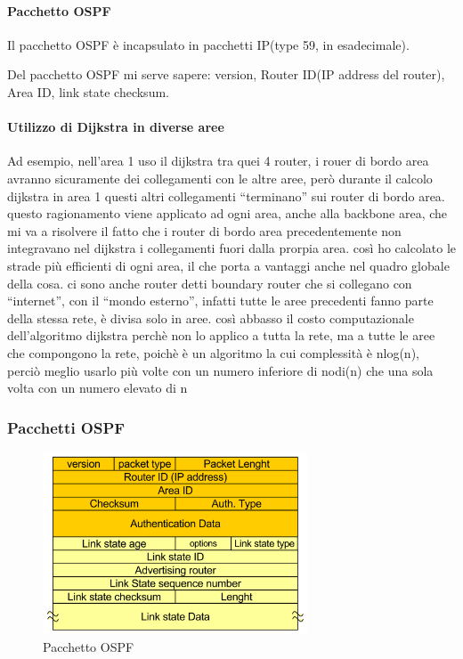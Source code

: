 \paragraph{Pacchetto OSPF}
Il pacchetto OSPF è incapsulato in pacchetti IP(type 59, in esadecimale).

Del pacchetto OSPF mi serve sapere: version, Router ID(IP address del router), Area ID, link state checksum.


\paragraph{Utilizzo di Dijkstra in diverse aree}
Ad esempio, nell'area 1 uso il dijkstra tra quei 4 router, i rouer di bordo area avranno sicuramente dei collegamenti con le altre aree, però durante il calcolo dijkstra in area 1 questi altri collegamenti “terminano” sui router di bordo area. 
questo ragionamento viene applicato ad ogni area, anche alla backbone area, che mi va a risolvere il fatto che i router di bordo area precedentemente non integravano nel dijkstra i collegamenti fuori dalla prorpia area. così ho calcolato le strade più efficienti di ogni area, il che porta a vantaggi anche nel quadro globale della cosa.
ci sono anche router detti boundary router che si collegano con “internet”, con il “mondo esterno”, infatti tutte le aree precedenti fanno parte della stessa rete, è divisa solo in aree.
così abbasso il costo computazionale dell'algoritmo dijkstra perchè non lo applico a tutta la rete, ma a tutte le aree che compongono la rete, poichè è un algoritmo la cui complessità è nlog(n), perciò meglio usarlo più volte con un numero inferiore di nodi(n) che una sola volta con un numero  elevato di n

\subsubsection{Pacchetti OSPF}

\begin{figure}[h!]
    \centering
    \includegraphics[width=0.7\textwidth]{images/pacchettoospf.png}
    \caption{Pacchetto OSPF}
    \label{fig:pacchettoospf}
\end{figure}

